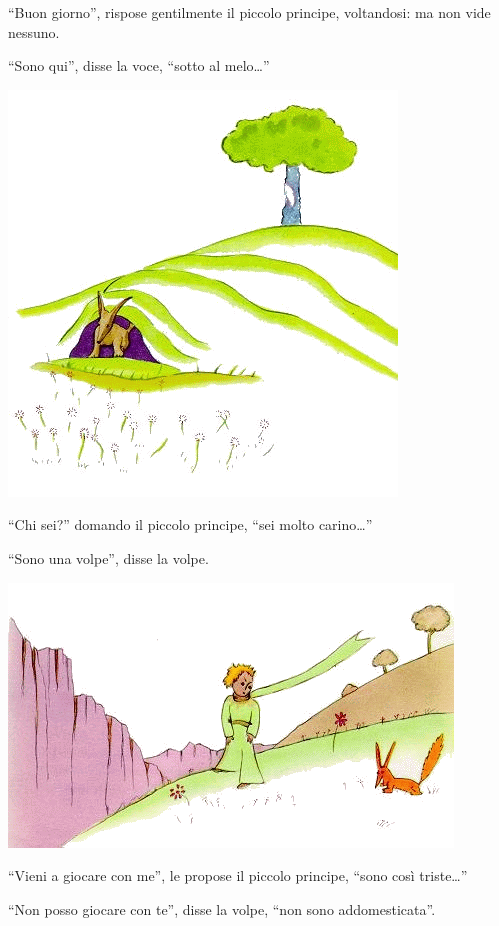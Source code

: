 \documentclass[11pt]{scrbook}
\begin{document}
``Buon giorno'', rispose gentilmente il piccolo principe, voltandosi: ma non vide nessuno.

``Sono qui'', disse la voce, ``sotto al melo\ldots{}''

\begin{center}
\includegraphics{img/21b}
\end{center}

``Chi sei?'' domando il piccolo principe, ``sei molto carino\ldots{}''

``Sono una volpe'', disse la volpe.

\begin{center}
\includegraphics{img/21a}
\end{center}

``Vieni a giocare con me'', le propose il piccolo principe, ``sono così triste\ldots{}''

``Non posso giocare con te'', disse la volpe, ``non sono addomesticata''.
\end{document}
